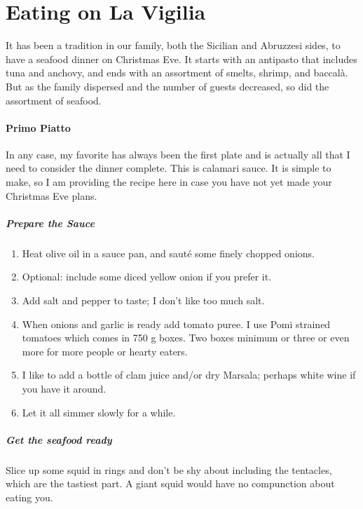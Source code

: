 \section{Eating on La Vigilia}


It has been a tradition in our family, both the Sicilian and Abruzzesi sides, to have a seafood dinner on Christmas Eve. It starts with an antipasto that includes tuna and anchovy, and ends with an assortment of smelts, shrimp, and baccalà. But as the family dispersed and the number of guests decreased, so did the assortment of seafood.

\paragraph{Primo Piatto}


In any case, my favorite has always been the first plate and is actually all that I need to consider the dinner complete. This is calamari sauce. It is simple to make, so I am providing the recipe here in case you have not yet made your Christmas Eve plans.

\subparagraph{Prepare the Sauce}


\begin{enumerate}


\item Heat olive oil in a sauce pan, and sauté some finely chopped onions.

\item Optional: include some diced yellow onion if you prefer it.

\item Add salt and pepper to taste; I don't like too much salt.

\item When onions and garlic is ready add tomato puree. I use Pomi strained tomatoes which comes in 750 g boxes. Two boxes minimum or three or even more for more people or hearty eaters.

\item I like to add a bottle of clam juice and/or dry Marsala; perhaps white wine if you have it around.

\item Let it all simmer slowly for a while.
\end{enumerate}


\subparagraph{Get the seafood ready}


Slice up some squid in rings and don't be shy about including the tentacles, which are the tastiest part. A giant squid would have no compunction about eating you.

